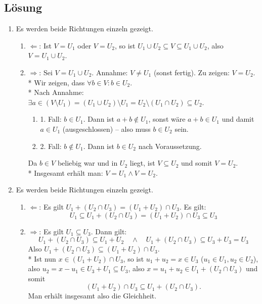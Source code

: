\subsection{Lösung}
\begin{enumerate}
	\item Es werden beide Richtungen einzeln gezeigt.
	\begin{enumerate}
		\item \( \Leftarrow \): Ist \( V = U_1 \) oder \( V = U_2 \), so ist \( U_1 \cup U_2 \subseteq V \subseteq U_1 \cup U_2 \), also \( V = U_1 \cup U_2 \).
		\item \( \Rightarrow \): Sei \( V = U_1 \cup U_2 \). Annahme: \( V \neq U_1 \) (sonst fertig). Zu zeigen: \( V = U_2 \). \\*
		Wir zeigen, dass \( \forall b \in V : b \in U_2 \). \\*
		Nach Annahme: \( \exists a \in (V \setminus U_1) = (U_1 \cup U_2) \setminus U_1 = U_2 \setminus (U_1 \cap U_2) \subseteq U_2 \).
		\begin{enumerate}
			\item 1. Fall: \( b \in U_1 \). Dann ist \( a+b \not \in U_1 \), sonst wäre \( a+b \in U_1 \) und damit \( a \in U_1 \) (ausgeschlossen) -- also muss \( b \in U_2 \) sein.
			\item 2. Fall: \( b \not \in U_1 \). Dann ist \( b \in U_2 \) nach Voraussetzung. 
		\end{enumerate}
		Da \( b \in V \) beliebig war und in \( U_2 \) liegt, ist \( V \subseteq U_2 \) und somit \( V = U_2 \). \\*
		Insgesamt erhält man: \( V = U_1 \wedge V = U_2 \).
	\end{enumerate}

	\item Es werden beide Richtungen einzeln gezeigt.
	\begin{enumerate}
		\item \( \Leftarrow \): Es gilt \( U_1 + (U_2 \cap U_3) = (U_1 + U_2) \cap U_3 \). Es gilt:
		\begin{equation*}
		 	U_1 \subseteq U_1 + (U_2 \cap U_3) = (U_1 + U_2) \cap U_3 \subseteq U_3
		 \end{equation*} 
		 \item \( \Rightarrow \): Es gilt \( U_1 \subseteq U_3 \). Dann gilt:
		 \begin{equation*}
		 	U_1 + (U_2 \cap U_3) \subseteq U_1 + U_2 \quad \wedge \quad U_1 + (U_2 \cap U_3) \subseteq U_3 + U_3 = U_3
		 \end{equation*}
		 Also \( U_1 + (U_2 \cap U_3) \subseteq (U_1 + U_2) \cap U_3 \). \\*
		 Ist nun \( x \in (U_1 + U_2) \cap U_3 \), so ist \( u_1 + u_2 = x \in U_3 \) (\( u_1 \in U_1, u_2 \in U_2 \)), also \( u_2 = x - u_1 \in U_3 + U_1 \subseteq U_3 \), also \( x = u_1 + u_2 \in U_1 + (U_2 \cap U_3) \) und somit
		 \begin{equation*}
		 	(U_1 + U_2) \cap U_3 \subseteq U_1 + (U_2 \cap U_3)\text{.}
		 \end{equation*}
		 Man erhält insgesamt also die Gleichheit.
	\end{enumerate}
\end{enumerate}

